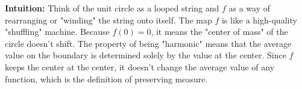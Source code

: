\begin{solution}
\bigskip

\textbf{Intuition:} 
Think of the unit circle as a looped string and $f$ as a way of rearranging or "winding" the string onto itself. The map $f$ is like a high-quality "shuffling" machine. Because $f(0)=0$, it means the "center of mass" of the circle doesn't shift. The property of being "harmonic" means that the average value on the boundary is determined solely by the value at the center. Since $f$ keeps the center at the center, it doesn't change the average value of any function, which is the definition of preserving measure.
\end{solution}
